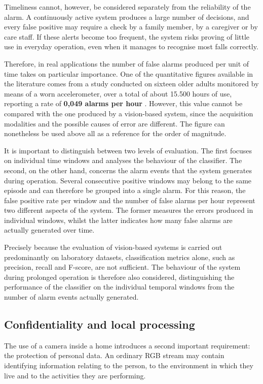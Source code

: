 Timeliness cannot, however, be considered separately from the reliability of
the alarm. A continuously active system produces a large number of decisions,
and every false positive may require a check by a family member, by a
caregiver or by care staff. If these alerts become too frequent, the system
risks proving of little use in everyday operation, even when it manages to
recognise most falls correctly.

Therefore, in real applications the number of false alarms produced per unit
of time takes on particular importance. One of the quantitative figures
available in the literature comes from a study conducted on sixteen older
adults monitored by means of a worn accelerometer, over a total of about
15.500 hours of use, reporting a rate of \textbf{0,049 alarms per hour}
\cite{KA}.
However, this value cannot be compared with the one produced by a vision-based system, since the acquisition modalities and the possible causes of error are different. The figure can nonetheless be used above all as a reference for the order of magnitude.

It is important to distinguish between two levels of evaluation. The first focuses on individual time windows and analyses the behaviour of the classifier. The second, on the other hand, concerns the alarm events that the system generates during operation. Several consecutive positive windows may belong to the same episode and can therefore be grouped into a single alarm. For this reason, the false positive rate per window and the number of false alarms per hour represent two different aspects of the system. The former measures the errors produced in individual windows, whilst the latter indicates how many false alarms are actually generated over time.

Precisely because the evaluation of vision-based systems is carried out
predominantly on laboratory datasets, classification metrics alone, such as
precision, recall and F-score, are not sufficient. The behaviour of the system
during prolonged operation is therefore also considered, distinguishing the
performance of the classifier on the individual temporal windows from the
number of alarm events actually generated.

\subsection{Confidentiality and local processing}

The use of a camera inside a home introduces a second important requirement:
the protection of personal data. An ordinary RGB stream may contain
identifying information relating to the person, to the environment in which
they live and to the activities they are performing.

